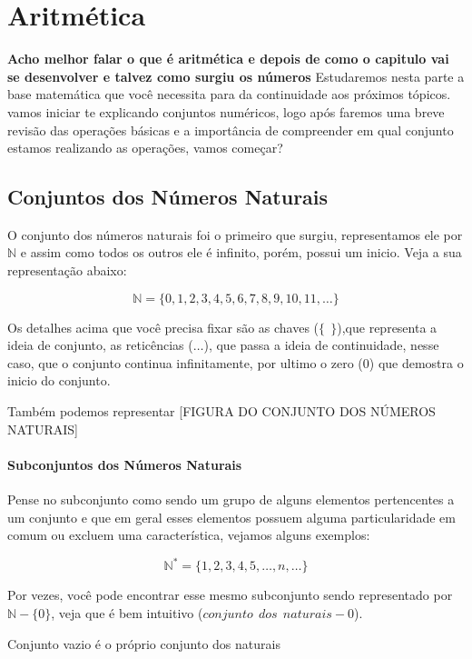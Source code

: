 \chapter{Aritmética}
\textbf{Acho melhor falar o que é aritmética e depois de como o capitulo vai se desenvolver e talvez como surgiu os números}
Estudaremos nesta parte a base matemática que você necessita para da continuidade aos próximos tópicos. vamos iniciar te explicando conjuntos numéricos, logo após faremos uma breve revisão das operações básicas e a importância de compreender em qual conjunto estamos realizando as operações, vamos começar?
\section{Conjuntos dos Números Naturais}
O conjunto dos números naturais foi o primeiro que surgiu, representamos ele por $\mathbb{N}$ e assim como todos os outros ele é infinito, porém, possui um inicio. Veja a sua representação abaixo:

$$ \mathbb{N}= \{0,1,2,3,4,5,6,7,8,9,10,11, \ldots \}$$

Os detalhes acima que você precisa fixar são as chaves ($\{~~ \}$),que representa a ideia de conjunto, as reticências ($\ldots$), que passa a ideia de continuidade, nesse caso, que o conjunto continua infinitamente, por ultimo o zero ($0$) que demostra o inicio do conjunto.

Também podemos representar 
[FIGURA DO CONJUNTO DOS NÚMEROS NATURAIS]

\subsubsection{Subconjuntos dos Números Naturais}
Pense no subconjunto como sendo um grupo de alguns elementos pertencentes a um conjunto e que em geral esses elementos possuem alguma particularidade em comum ou excluem uma característica, vejamos alguns exemplos:

\begin{example}
	$$\mathbb{N}^{*}=\{1,2,3,4,5,\ldots,n,\ldots\}$$
	
	Por vezes, você pode encontrar esse mesmo subconjunto sendo representado por $\mathbb{N}-\{ 0 \}$, veja que é bem intuitivo ($conjunto~~dos~~naturais - 0$).
\end{example}


\begin{obs}
Conjunto vazio é o próprio conjunto dos naturais
\end{obs}



